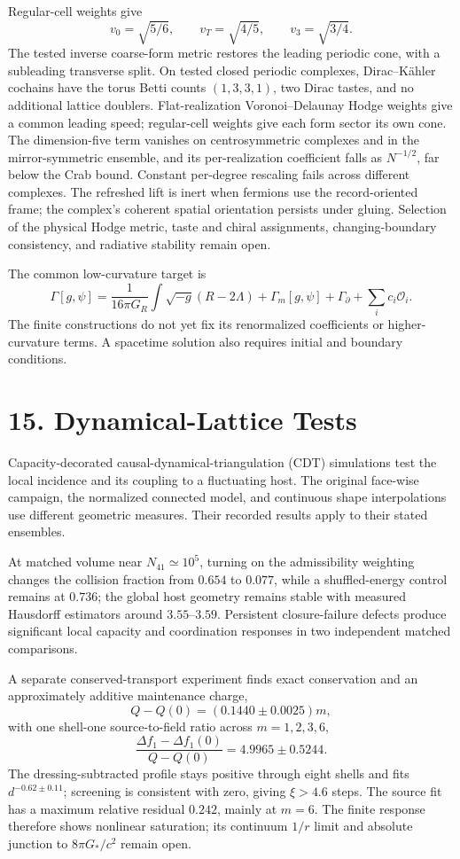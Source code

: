 \documentclass[11pt]{article}
\begin{document}
Regular-cell weights give
\[
v_0=\sqrt{5/6},\qquad v_T=\sqrt{4/5},\qquad v_3=\sqrt{3/4}.
\]
The tested inverse coarse-form metric restores the leading periodic cone,
with a subleading transverse split. On tested closed periodic complexes,
Dirac--K\"ahler cochains have the torus Betti counts $(1,3,3,1)$,
two Dirac tastes, and no additional lattice doublers. Flat-realization
Voronoi--Delaunay Hodge weights give a common leading speed; regular-cell
weights give each form sector its own cone. The dimension-five term vanishes
on centrosymmetric complexes and in the mirror-symmetric ensemble, and its
per-realization coefficient falls as $N^{-1/2}$, far below the Crab bound.
Constant per-degree rescaling fails across different complexes.
The refreshed lift is inert when fermions use the record-oriented frame;
the complex's coherent spatial orientation persists under gluing.
Selection of the physical Hodge metric, taste and chiral assignments,
changing-boundary consistency, and radiative stability remain open.

The common low-curvature target is
\[
\Gamma[g,\psi]=\frac1{16\pi G_R}\int\sqrt{-g}(R-2\Lambda)
+\Gamma_m[g,\psi]+\Gamma_\partial+\sum_i c_i\mathcal O_i.
\]
The finite constructions do not yet fix its renormalized
coefficients or higher-curvature terms. A spacetime solution
also requires initial and boundary conditions.

\section{15. Dynamical-Lattice Tests}

Capacity-decorated causal-dynamical-triangulation (CDT) simulations test the local incidence and its coupling to a fluctuating host. The original face-wise campaign, the normalized connected model, and continuous shape interpolations use different geometric measures. Their recorded results apply to their stated ensembles.

At matched volume near $N_{41}\simeq10^5$, turning on the admissibility weighting changes the collision fraction from $0.654$ to $0.077$, while a shuffled-energy control remains at $0.736$; the global host geometry remains stable with measured Hausdorff estimators around $3.55$--$3.59$. Persistent closure-failure defects produce significant local capacity and coordination responses in two independent matched comparisons.

A separate conserved-transport experiment finds exact conservation and an approximately additive maintenance charge,
\[
Q-Q(0)=(0.1440\pm0.0025)m,
\]
with one shell-one source-to-field ratio across $m=1,2,3,6$,
\[
\frac{\Delta f_1-\Delta f_1(0)}{Q-Q(0)}
=4.9965\pm0.5244.
\]
The dressing-subtracted profile stays positive through eight shells and fits $d^{-0.62\pm0.11}$; screening is consistent with zero, giving $\xi>4.6$ steps. The source fit has a maximum relative residual $0.242$, mainly at $m=6$. The finite response therefore shows nonlinear saturation; its continuum $1/r$ limit and absolute junction to $8\pi G_*/c^2$ remain open.
\end{document}
